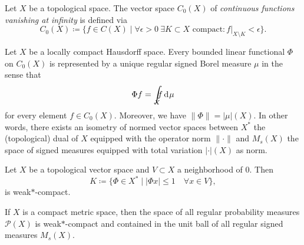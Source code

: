 \begin{defin}
  \label{def:vanishing}
  Let \(X\) be a topological space. The vector space \(C_0(X)\) of \emph{continuous functions vanishing at infinity} is defined via
  \[
    C_0(X) \coloneqq \{f \in C(X) \mid \forall \epsilon > 0\ \exists K \subset X \text{ compact}\colon f|_{X\setminus K} < \epsilon\}.
  \]
\end{defin}

\begin{thm}
  \label{thm:riesz-markow}
  Let \(X\) be a locally compact Hausdorff space. Every bounded linear functional \(\Phi\) on \(C_0(X)\) is represented by a unique regular signed Borel measure \(\mu\) in the sense that \[
    \Phi f = \int_{\hspace{-5pt}X}\hspace{-5pt}f \d\mu
  \]
  for every element \(f \in C_0(X)\). Moreover, we have \(\|\Phi\| = |\mu|(X)\). In other words, there exists an isometry of normed vector spaces between \(X^\ast\) the (topological) dual of \(X\) equipped with the operator norm \(\|\cdot \|\) and \(M_{s}(X)\) the space of signed measures equipped with total variation \(|\cdot|(X)\) as norm.
\end{thm}

\begin{thm}
  \label{thm:banach-alaoglu}
  Let \(X\) be a topological vector space and \(V \subset X\) a neighborhood of \(0\). Then
  \[
    K \coloneqq \{ \Phi \in X^\ast \mid |\Phi x| \leq 1 \quad \forall x \in V\},
  \]
  is weak\(\ast\)-compact.
\end{thm}

\begin{cor}
  \label{cor:banach-alaoglu}
  If \(X\) is a compact metric space, then the space of all regular probability measures \(\mathcal{P}(X)\) is weak\(\ast\)-compact and contained in the unit ball of all regular signed measures \(M_{s}(X)\).
\end{cor}

